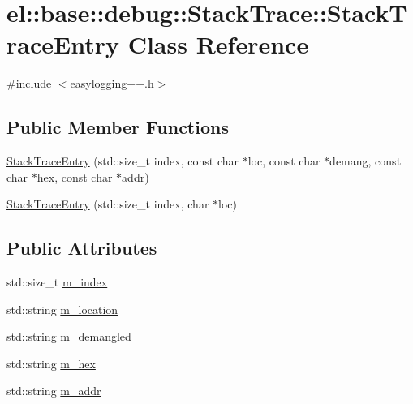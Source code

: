 \hypertarget{classel_1_1base_1_1debug_1_1_stack_trace_1_1_stack_trace_entry}{}\section{el\+:\+:base\+:\+:debug\+:\+:Stack\+Trace\+:\+:Stack\+Trace\+Entry Class Reference}
\label{classel_1_1base_1_1debug_1_1_stack_trace_1_1_stack_trace_entry}


{\ttfamily \#include $<$easylogging++.\+h$>$}

\subsection*{Public Member Functions}
\begin{DoxyCompactItemize}
\item 
\hyperlink{classel_1_1base_1_1debug_1_1_stack_trace_1_1_stack_trace_entry_a49b21719794ee5de7f70e2558ebcba9e}{Stack\+Trace\+Entry} (std\+::size\+\_\+t index, const char $\ast$loc, const char $\ast$demang, const char $\ast$hex, const char $\ast$addr)
\item 
\hyperlink{classel_1_1base_1_1debug_1_1_stack_trace_1_1_stack_trace_entry_a9fbf0675fe713b1ac4ec692bbe661afe}{Stack\+Trace\+Entry} (std\+::size\+\_\+t index, char $\ast$loc)
\end{DoxyCompactItemize}
\subsection*{Public Attributes}
\begin{DoxyCompactItemize}
\item 
std\+::size\+\_\+t \hyperlink{classel_1_1base_1_1debug_1_1_stack_trace_1_1_stack_trace_entry_a8361364e2cbb728a2e2a17db8b308842}{m\+\_\+index}
\item 
std\+::string \hyperlink{classel_1_1base_1_1debug_1_1_stack_trace_1_1_stack_trace_entry_aaf6f6c49736d5c10b2047dde6eef4a38}{m\+\_\+location}
\item 
std\+::string \hyperlink{classel_1_1base_1_1debug_1_1_stack_trace_1_1_stack_trace_entry_a7ca2c3d08ea6fbef5b605041500c7d47}{m\+\_\+demangled}
\item 
std\+::string \hyperlink{classel_1_1base_1_1debug_1_1_stack_trace_1_1_stack_trace_entry_af4d5ffabfe8bbffb5eedcdd95b4eebfe}{m\+\_\+hex}
\item 
std\+::string \hyperlink{classel_1_1base_1_1debug_1_1_stack_trace_1_1_stack_trace_entry_a11b23a57f14add4b825d97bb1d58e6f2}{m\+\_\+addr}
\end{DoxyCompactItemize}
